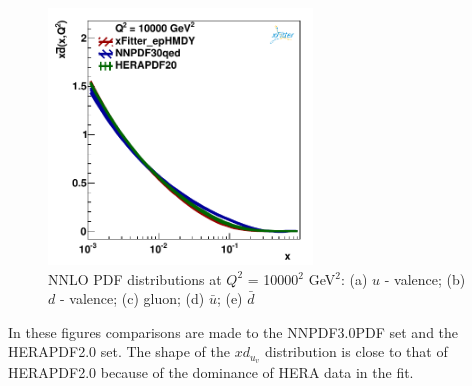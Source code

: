 \begin{figure}
\includegraphics[width=7cm]{dbar_10000.pdf} 
\caption{NNLO PDF distributions at $Q^{2}$ = 10000$^{2}$ GeV$^{2}$: (a) $u$ - valence; (b) $d$ - valence; (c) gluon; (d) $\bar{u}$; (e) $\bar{d}$}
\label{PDF_10000GeV}
\end{figure}
In these figures comparisons are made to the NNPDF3.0PDF set and the HERAPDF2.0 set.
The shape of the $xd_{u_v}$ distribution is close to that of HERAPDF2.0 
because of the dominance of HERA data in the fit. 


